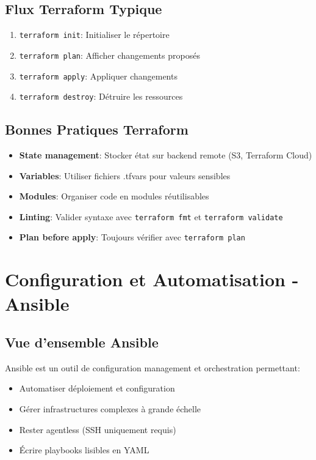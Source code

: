 \documentclass[12pt,a4paper]{report}
\begin{document}
\section{Flux Terraform Typique}

\begin{enumerate}
    \item \texttt{terraform init}: Initialiser le répertoire
    \item \texttt{terraform plan}: Afficher changements proposés
    \item \texttt{terraform apply}: Appliquer changements
    \item \texttt{terraform destroy}: Détruire les ressources
\end{enumerate}

\section{Bonnes Pratiques Terraform}

\begin{itemize}
    \item \textbf{State management}: Stocker état sur backend remote (S3, Terraform Cloud)
    \item \textbf{Variables}: Utiliser fichiers .tfvars pour valeurs sensibles
    \item \textbf{Modules}: Organiser code en modules réutilisables
    \item \textbf{Linting}: Valider syntaxe avec \texttt{terraform fmt} et \texttt{terraform validate}
    \item \textbf{Plan before apply}: Toujours vérifier avec \texttt{terraform plan}
\end{itemize}

\newpage

\chapter{Configuration et Automatisation - Ansible}

\section{Vue d'ensemble Ansible}

Ansible est un outil de configuration management et orchestration permettant:
\begin{itemize}
    \item Automatiser déploiement et configuration
    \item Gérer infrastructures complexes à grande échelle
    \item Rester agentless (SSH uniquement requis)
    \item Écrire playbooks lisibles en YAML
\end{itemize}
\end{document}
